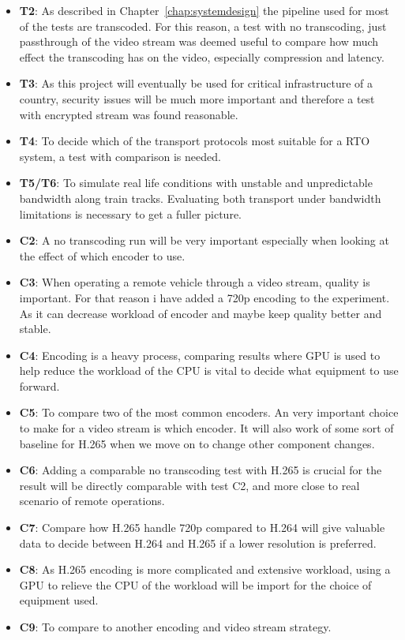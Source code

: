 \begin{itemize}
    \item \textbf{T2}: As described in Chapter~\ref{chap:systemdesign} the pipeline used for most of the tests are transcoded. For this reason, a test with no transcoding, just passthrough of the video stream was deemed useful to compare how much effect the transcoding has on the video, especially compression and latency. 
    \item \textbf{T3}: As this project will eventually be used for critical infrastructure of a country, security issues will be much more important and therefore a test with encrypted stream was found reasonable.
    \item \textbf{T4}: To decide which of the transport protocols most suitable for a RTO system, a test with comparison is needed.
    \item \textbf{T5/T6}: To simulate real life conditions with unstable and unpredictable bandwidth along train tracks. Evaluating both transport under bandwidth limitations is necessary to get a fuller picture.
\end{itemize}



\begin{itemize}
    \item \textbf{C2}: A no transcoding run will be very important especially when looking at the effect of which encoder to use. 
    \item \textbf{C3}: When operating a remote vehicle through a video stream, quality is important. For that reason i have added a 720p encoding to the experiment. As it can decrease workload of encoder and maybe keep quality better and stable.
    \item \textbf{C4}: Encoding is a heavy process, comparing results where GPU is used to help reduce the workload of the CPU is vital to decide what equipment to use forward.
    \item \textbf{C5}: To compare two of the most common encoders. An very important choice to make for a video stream is which encoder. It will also work of some sort of baseline for H.265 when we move on to change other component changes.
    \item \textbf{C6}: Adding a comparable no transcoding test with H.265 is crucial for the result will be directly comparable with test C2, and more close to real scenario of remote operations.
    \item \textbf{C7}: Compare how H.265 handle 720p compared to H.264 will give valuable data to decide between H.264 and H.265 if a lower resolution is preferred. 
    \item \textbf{C8}: As H.265 encoding is more complicated and extensive workload, using a GPU to relieve the CPU of the workload will be import for the choice of equipment used.
    \item \textbf{C9}: To compare to another encoding and video stream strategy. 
\end{itemize}
 
